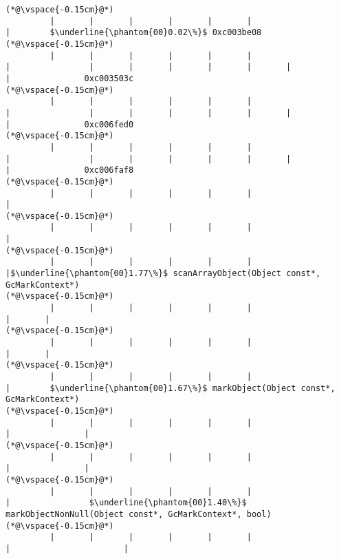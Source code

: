 \begin{lstlisting}[caption=NewDirectByteBuffer, label=profile:C2JNewDirectBuffer-512, numberbychapter=true, frame=lines, float, floatplacement=t]
(*@\vspace{-0.15cm}@*)
         |       |       |       |       |       |                       |        $\underline{\phantom{00}0.02\%}$ 0xc003be08
(*@\vspace{-0.15cm}@*)
         |       |       |       |       |       |                       |                |       |       |       |       |       |                       |               0xc003503c
(*@\vspace{-0.15cm}@*)
         |       |       |       |       |       |                       |                |       |       |       |       |       |                       |               0xc006fed0
(*@\vspace{-0.15cm}@*)
         |       |       |       |       |       |                       |                |       |       |       |       |       |                       |               0xc006faf8
(*@\vspace{-0.15cm}@*)
         |       |       |       |       |       |                       |
(*@\vspace{-0.15cm}@*)
         |       |       |       |       |       |                       |
(*@\vspace{-0.15cm}@*)
         |       |       |       |       |       |                       |$\underline{\phantom{00}1.77\%}$ scanArrayObject(Object const*, GcMarkContext*)
(*@\vspace{-0.15cm}@*)
         |       |       |       |       |       |                       |       |
(*@\vspace{-0.15cm}@*)
         |       |       |       |       |       |                       |       |
(*@\vspace{-0.15cm}@*)
         |       |       |       |       |       |                       |        $\underline{\phantom{00}1.67\%}$ markObject(Object const*, GcMarkContext*)
(*@\vspace{-0.15cm}@*)
         |       |       |       |       |       |                       |               |
(*@\vspace{-0.15cm}@*)
         |       |       |       |       |       |                       |               |
(*@\vspace{-0.15cm}@*)
         |       |       |       |       |       |                       |                $\underline{\phantom{00}1.40\%}$ markObjectNonNull(Object const*, GcMarkContext*, bool)
(*@\vspace{-0.15cm}@*)
         |       |       |       |       |       |                       |                       |

\end{lstlisting}
